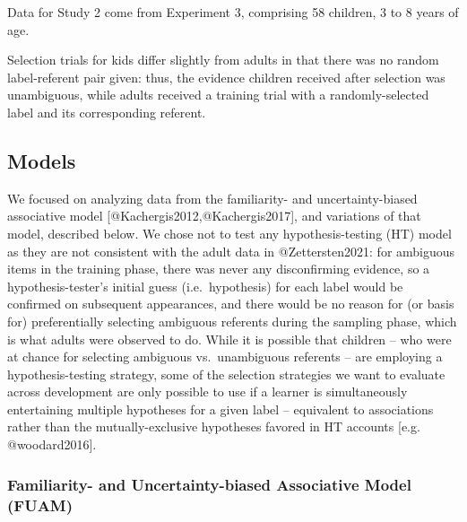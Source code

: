 \documentclass[10pt, letterpaper]{article}
\begin{document}
Data for Study 2 come from Experiment 3, comprising 58 children, 3 to 8
years of age.

Selection trials for kids differ slightly from adults in that there was
no random label-referent pair given: thus, the evidence children
received after selection was unambiguous, while adults received a
training trial with a randomly-selected label and its corresponding
referent.

\subsection{Models}\label{models}

We focused on analyzing data from the familiarity- and
uncertainty-biased associative model
{[}@Kachergis2012,@Kachergis2017{]}, and variations of that model,
described below. We chose not to test any hypothesis-testing (HT) model
as they are not consistent with the adult data in @Zettersten2021: for
ambiguous items in the training phase, there was never any disconfirming
evidence, so a hypothesis-tester's initial guess (i.e.~hypothesis) for
each label would be confirmed on subsequent appearances, and there would
be no reason for (or basis for) preferentially selecting ambiguous
referents during the sampling phase, which is what adults were observed
to do. While it is possible that children -- who were at chance for
selecting ambiguous vs.~unambiguous referents -- are employing a
hypothesis-testing strategy, some of the selection strategies we want to
evaluate across development are only possible to use if a learner is
simultaneously entertaining multiple hypotheses for a given label --
equivalent to associations rather than the mutually-exclusive hypotheses
favored in HT accounts {[}e.g. @woodard2016{]}.

\subsubsection{Familiarity- and Uncertainty-biased Associative Model
(FUAM)}\label{familiarity--and-uncertainty-biased-associative-model-fuam}
\end{document}

